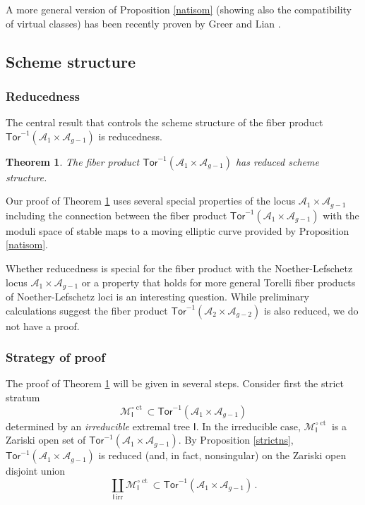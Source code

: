 \documentclass[11pt]{amsart}
\newtheorem{thm}{Theorem}
\theoremstyle{definition}
\newcommand{\M}{\mathcal{M}}
\newcommand{\A}{\mathcal{A}}
\DeclareMathOperator{\ct}{ct}
\newcommand{\Tor}{\mathsf{Tor}}
\begin{document}
{A more general version of Proposition \ref{natisom} (showing also the
compatibility of virtual classes) has
been recently proven by
Greer and Lian \cite{GreerLian}.

\subsection{Scheme structure} \subsubsection{Reducedness}
The central result that
controls the scheme structure of the fiber product $\Tor^{-1}(\A_1\times \A_{g-1})$ is reducedness.

\begin{thm} \label{reddd}
The fiber product $\Tor^{-1}(\A_1\times \A_{g-1})$ has reduced scheme structure.
\end{thm}

Our proof of Theorem \ref{reddd} uses several special properties of the locus
$\mathcal{A}_1\times \mathcal{A}_{g-1}$ including the connection between the fiber product $\Tor^{-1}(\A_1\times \A_{g-1})$
with the moduli space of stable maps to a moving elliptic curve provided by Proposition \ref{natisom}.


Whether reducedness is special for the fiber product with
the Noether-Lefschetz locus $\A_1\times \A_{g-1}$ or a property that holds
for more general Torelli fiber products of Noether-Lefschetz loci is an interesting question.
While preliminary calculations suggest the fiber product $\Tor^{-1}(\A_2\times \A_{g-2})$
is also reduced, we do not have a proof.

\subsubsection{Strategy of proof}
The proof of Theorem \ref{reddd} will be given in several steps. Consider first the strict stratum 
$$\M_\mathsf{I}^{\circ \ct} \subset \Tor^{-1}(\A_1\times \A_{g-1})$$ 
determined by an {\em irreducible} extremal tree $\mathsf{I}$. 
In the irreducible case,  $\M_\mathsf{I}^{\circ \ct}$ is a Zariski open
set of $\Tor^{-1}(\A_1\times \A_{g-1})$.
By Proposition \ref{strictns}, 
$\Tor^{-1}(\A_1\times \A_{g-1})$ is reduced (and, in fact, nonsingular) on
the Zariski open disjoint union
\begin{equation} \label{biguu}
\coprod_{\mathsf{I} \, \text{irr}} \M_\mathsf{I}^{\circ \ct}
\subset \Tor^{-1}(\A_1\times \A_{g-1})\,. 
\end{equation}

}
\end{document}
